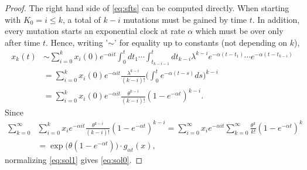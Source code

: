 \documentclass{imsart}
\theoremstyle{plain}
\theoremstyle{definition}
\begin{document}
\begin{proof}
  The right hand side of \eqref{eq:sfts} can be computed directly. When starting with $K_0=i\leq k$, a total of $k-i$ mutations must be gained by time $t$. In addition, every mutation starts an exponential clock at rate $\alpha$ which must be over only after time $t$. Hence, writing '$\sim$' for equality up to constants   (not depending on $k$), 
  \begin{equation}\label{eq:sol1}
    \begin{aligned}
      x_k(t) & \sim \sum_{i=0}^k x_i(0) e^{-\alpha i t} \int_0^t dt_1
      \cdots \int_{t_{k-i-1}}^t dt_{k-i} \lambda^{k-i} e^{-\alpha
        (t-t_1)} \cdots e^{-\alpha (t-t_{k - i})} \\ & = \sum_{i=0}^k
      x_i(0) e^{-\alpha i t} \frac{\lambda^{k-i}}{(k-i)!}
      \Big(\int_0^t e^{-\alpha(t-s)}ds\Big)^{k-i} \\ & = \sum_{i=0}^k
      x_i(0) e^{-\alpha i t} \frac{\theta^{k-i}}{(k-i)!} (1-e^{-\alpha
        t})^{k-i}.
    \end{aligned}
  \end{equation}
  Since 
  \begin{align*}
    \sum_{k=0}^\infty & \sum_{i=0}^k x_i e^{-\alpha i t}
    \frac{\theta^{k-i}}{(k-i)!} (1-e^{-\alpha t})^{k-i} =
    \sum_{i=0}^\infty x_i e^{-\alpha i t} \sum_{k=0}^\infty
    \frac{\theta^{k}}{k!} (1-e^{-\alpha t})^{k} \\ & = \exp\Big(
    \theta(1-e^{-\alpha t})\Big) \cdot g_{\alpha t}(x),
  \end{align*}
  normalizing \eqref{eq:sol1} gives \eqref{eq:sol0}. 
\end{proof}
 
\end{document}
